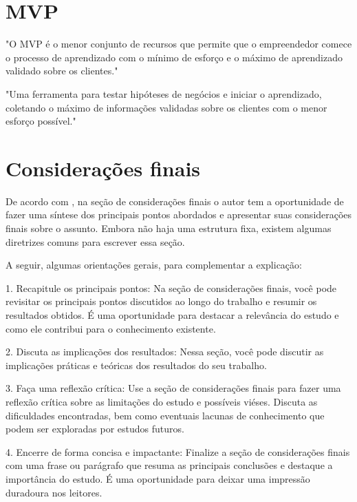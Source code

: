\documentclass[
	article,			%
	12pt,				%
	oneside,			%
	a4paper,			%
    BIBLATEX,           %
	english,			%
	brazil,				%
	sumario=tradicional
	]{abntex2}
\begin{document}
\section{MVP}

"O MVP é o menor conjunto de recursos que permite que o empreendedor comece o processo de aprendizado com o mínimo de esforço e o máximo de aprendizado validado sobre os clientes."

"Uma ferramenta para testar hipóteses de negócios e iniciar o aprendizado, coletando o máximo de informações validadas sobre os clientes com o menor esforço possível."


% 


\section{Considerações finais}

De acordo com , na seção de considerações finais o autor tem a oportunidade de fazer uma síntese dos principais pontos abordados e apresentar suas considerações finais sobre o assunto. Embora não haja uma estrutura fixa, existem algumas diretrizes comuns para escrever essa seção.

A seguir, algumas orientações gerais, para complementar a explicação:

1. Recapitule os principais pontos: Na seção de considerações finais, você pode revisitar os principais pontos discutidos ao longo do trabalho e resumir os resultados obtidos. É uma oportunidade para destacar a relevância do estudo e como ele contribui para o conhecimento existente.

2. Discuta as implicações dos resultados: Nessa seção, você pode discutir as implicações práticas e teóricas dos resultados do seu trabalho. 

3. Faça uma reflexão crítica: Use a seção de considerações finais para fazer uma reflexão crítica sobre as limitações do estudo e possíveis viéses. Discuta as dificuldades encontradas, bem como eventuais lacunas de conhecimento que podem ser exploradas por estudos futuros.

4. Encerre de forma concisa e impactante: Finalize a seção de considerações finais com uma frase ou parágrafo que resuma as principais conclusões e destaque a importância do estudo. É uma oportunidade para deixar uma impressão duradoura nos leitores.
\end{document}
